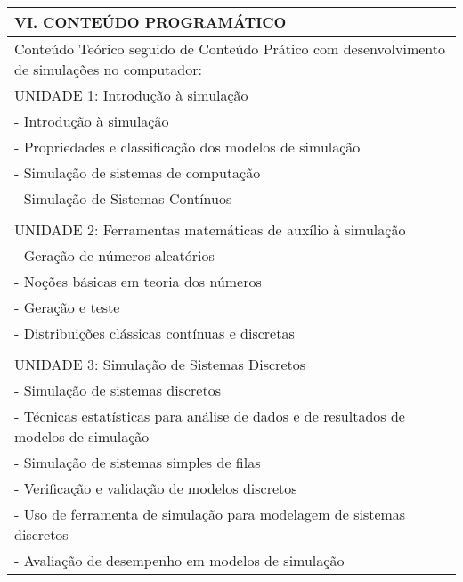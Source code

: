 \documentclass[12pt]{article}
\begin{document}
\begin{longtable}{|L{1.025\textwidth}|} \hline
%
{\bf VI. CONTEÚDO PROGRAMÁTICO } \\ \hline
Conteúdo Teórico seguido de Conteúdo Prático com desenvolvimento de simulações no computador:\\
UNIDADE 1: Introdução à simulação\\
- Introdução à simulação\\
- Propriedades e classificação dos modelos de simulação\\
- Simulação de sistemas de computação\\
- Simulação de Sistemas Contínuos\\
\\
UNIDADE 2: Ferramentas matemáticas de auxílio à simulação \\
- Geração de números aleatórios\\
- Noções básicas em teoria dos números\\
- Geração e teste\\
- Distribuições clássicas contínuas e discretas\\
\\
UNIDADE 3: Simulação de Sistemas Discretos\\
- Simulação de sistemas discretos\\
- Técnicas estatísticas para análise de dados e de resultados de modelos de simulação\\
- Simulação de sistemas simples de filas\\
- Verificação e validação de modelos discretos\\
- Uso de ferramenta de simulação para modelagem de sistemas discretos\\
- Avaliação de desempenho em modelos de simulação
\\

\hline
\end{longtable} 

\newpage
\end{document}
